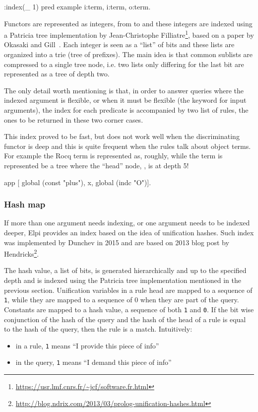 \documentclass[a4paper, 11pt]{book}
\begin{document}
\begin{elpicode}
:index(_ 1) %
pred example i:term, i:term, o:term.
\end{elpicode}

\noindent
Functors are represented as integers, from  to 
and these integers are indexed using a Patricia tree implementation by
Jean-Christophe Filliatre\footnote{\url{https://usr.lmf.cnrs.fr/~jcf/software.fr.html}},
based on a paper by Okasaki and Gill~\cite{Okasaki:98:IntMap}.
Each integer is seen as a ``list'' of bits and these lists are organized into
a trie (tree of prefixes). The main idea is that common sublists are compressed
to a single tree node, i.e. two lists only differing for the last bit are
represented as a tree of depth two.

The only detail worth mentioning is that, in order to answer queries where
the indexed argument is flexible, or when it must be flexible (the 
keyword for input arguments), the index for each predicate is accompanied
by two list of rules, the ones to be returned in these two corner cases.

This index proved to be fast, but does not work well when the discriminating
functor is deep and this is quite frequent when the rules talk about
object  terms.
For example the Rocq term  is represented as, roughly,
 while the term  is represented be a
tree where the ``head'' node, , is at depth 5!

\begin{elpicode}
  app [ global (const "plus"), x, global (indc "O")].
\end{elpicode}

\subsubsection{Hash map}

If more than one argument needs indexing, or one argument needs to
be indexed deeper, Elpi provides an index based on the idea of
unification hashes. Such index was implemented by Dunchev in 2015
and are based on 2013 blog post by
Hendricks\footnote{\url{http://blog.ndrix.com/2013/03/prolog-unification-hashes.html}}.

The hash value, a list of bits, is generated hierarchically and up to the
specified depth and is indexed using the Patricia tree implementation mentioned
in the previous section.
Unification variables in a rule head are mapped to a
sequence of \texttt{1}, while they are mapped to a sequence of 0 when they are part of
the query. Constants are mapped
to a hash value, a sequence of both \texttt{1} and \texttt{0}. If the bit wise conjunction \ocaml{&}
of the hash of the query and the hash of the head of a rule is equal to the hash of
the query, then the rule is a match.
Intuitively:
\begin{itemize}
\item in a rule, \texttt{1} means ``I provide this piece of info''
\item in the query, \texttt{1} means ``I demand this piece of info''
\end{itemize}
\end{document}
